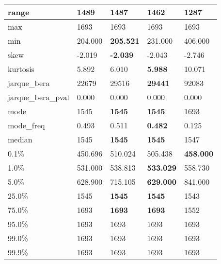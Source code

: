 \begin{table}[H]
\begin{tabular}{|l|m{10em}|m{10em}|m{10em}|m{10em}|}
\hline range & 1489 & \bfseries 1487 & 1462 & \cellcolor[rgb]{0.9, 0.54, 0.52} 1287 \\
\hline max & 1693 & 1693 & 1693 & 1693 \\
\hline min & 204.000 & \bfseries 205.521 & 231.000 & \cellcolor[rgb]{0.9, 0.54, 0.52} 406.000 \\
\hline skew & -2.019 & \bfseries -2.039 & -2.043 & \cellcolor[rgb]{0.9, 0.54, 0.52} -2.746 \\
\hline kurtosis & 5.892 & 6.010 & \bfseries 5.988 & \cellcolor[rgb]{0.9, 0.54, 0.52} 10.071 \\
\hline jarque\_bera & 22679 & 29516 & \bfseries 29441 & \cellcolor[rgb]{0.9, 0.54, 0.52} 92083 \\
\hline jarque\_bera\_pval & 0.000 & 0.000 & 0.000 & 0.000 \\
\hline mode & 1545 & \bfseries 1545 & \bfseries 1545 & \cellcolor[rgb]{0.9, 0.54, 0.52} 1693 \\
\hline mode\_freq & 0.493 & 0.511 & \bfseries 0.482 & \cellcolor[rgb]{0.9, 0.54, 0.52} 0.125 \\
\hline median & 1545 & \bfseries 1545 & \bfseries 1545 & \cellcolor[rgb]{0.9, 0.54, 0.52} 1547 \\
\hline 0.1\% & 450.696 & \cellcolor[rgb]{0.9, 0.54, 0.52} 510.024 & 505.438 & \bfseries 458.000 \\
\hline 1.0\% & 531.000 & 538.813 & \bfseries 533.029 & \cellcolor[rgb]{0.9, 0.54, 0.52} 558.730 \\
\hline 5.0\% & 628.900 & 715.105 & \bfseries 629.000 & \cellcolor[rgb]{0.9, 0.54, 0.52} 841.000 \\
\hline 25.0\% & 1545 & \bfseries 1545 & \bfseries 1545 & \cellcolor[rgb]{0.9, 0.54, 0.52} 1543 \\
\hline 75.0\% & 1693 & \bfseries 1693 & \bfseries 1693 & \cellcolor[rgb]{0.9, 0.54, 0.52} 1552 \\
\hline 95.0\% & 1693 & 1693 & 1693 & 1693 \\
\hline 99.0\% & 1693 & 1693 & 1693 & 1693 \\
\hline 99.9\% & 1693 & 1693 & 1693 & 1693 \\
\hline
\end{tabular}
\end{table}
